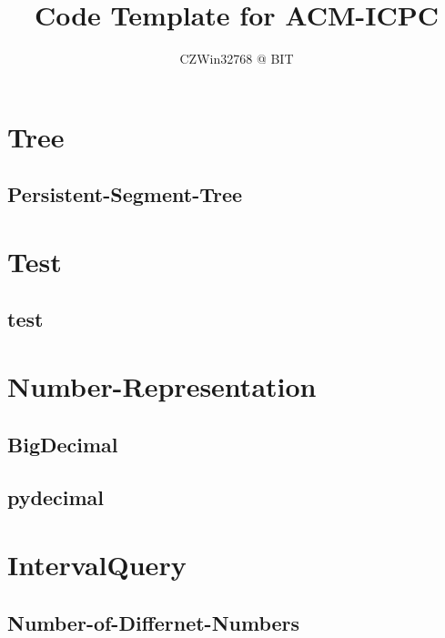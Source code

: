 \documentclass[a4paper, twocolumn]{article}
\title{Code Template for ACM-ICPC}
\author{CZWin32768 @ BIT}
\begin{document}
\begin{titlepage}
\maketitle
\thispagestyle{empty}
\pagebreak
\pagestyle{plain}
\tableofcontents
\end{titlepage}
  
\section{Tree}
\subsection{Persistent-Segment-Tree}

\section{Test}
\subsection{test}

\section{Number-Representation}
\subsection{BigDecimal}

\subsection{pydecimal}

\section{IntervalQuery}
\subsection{Number-of-Differnet-Numbers}

\end{document}
